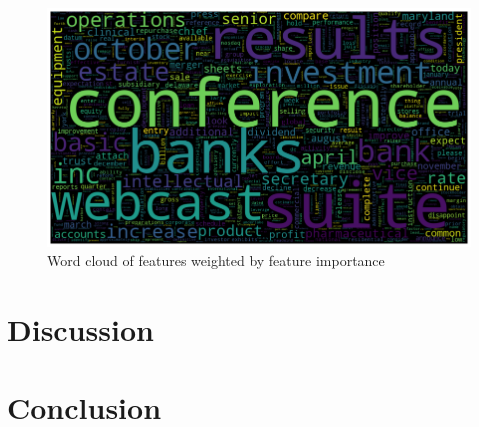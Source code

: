 \documentclass{article}
\begin{document}
	\begin{figure}[h!]
		\includegraphics[width=\linewidth]{img/feat_imp.png}
		\caption{Word cloud of features weighted by feature importance}
		\label{fig:feat_imp}
	\end{figure}
	
	
	\section{Discussion}
	
	\section{Conclusion}
	
	
\clearpage
\printbibliography
\end{document}
